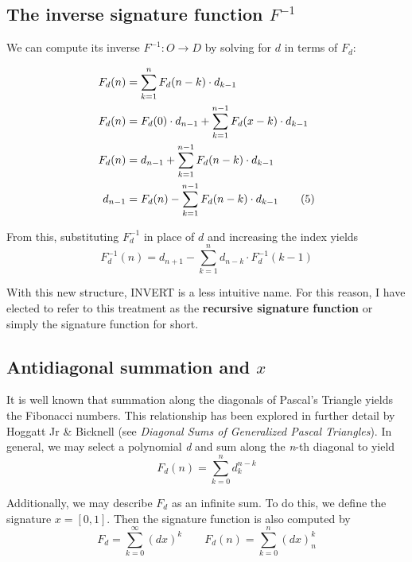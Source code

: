 \documentclass{article}
\begin{document}
\subsection{The inverse signature function $F^{-1}$}

\noindent We can compute its inverse $F^{-1} : O \rightarrow D$ by solving for $d$ in terms of $F_d$:

\begin{align*}
 F_{d}(n) &= \sum_{k=1}^{n} F_{d}(n-k) \cdot d_{k-1}\\
F_{d}(n) &= F_d(0) \cdot d_{n-1} + \sum_{k=1}^{n-1} F_{d}(x-k) \cdot d_{k-1}\\
F_{d}(n) &= d_{n-1} +  \sum_{k=1}^{n-1} F_{d}(n-k) \cdot d_{k-1}\\
d_{n-1} &= F_{d}(n) - \sum_{k=1}^{n-1} F_{d}(n-k) \cdot d_{k-1}\tag{5\refstepcounter{equation}} \end{align*}

\noindent From this, substituting $F_{d}^{-1}$ in place of $d$ and increasing the index yields \begin{equation}F_{d}^{-1}(n) = d_{n+1} - \sum_{k=1}^{n} d_{n-k} \cdot F_{d}^{-1}(k-1)\end{equation}

\noindent With this new structure, INVERT is a less intuitive name. For this reason, I have elected to refer to this treatment as the \textbf{recursive signature function} or simply the signature function for short.

\subsection{Antidiagonal summation and $x$ }

It is well known that summation along the diagonals of Pascal's Triangle yields the Fibonacci numbers. This relationship has been explored in further detail by Hoggatt Jr \& Bicknell (see \textit{Diagonal Sums of Generalized Pascal Triangles}). In general, we may select a polynomial \textit{d} and sum along the \textit{n}-th diagonal to yield \begin{equation} F_{d}(n) = \sum_{k=0}^n d_{k}^{n-k}\end{equation}

\noindent Additionally, we may describe $F_d$ as an infinite sum. To do this, we define the signature $x = [0, 1]$. Then the signature function is also computed by \begin{equation}F_d = \sum_{k=0}^{\infty} (d x )^k \qquad  F_d(n) = \sum_{k=0}^{n} (d x )_{n}^k\end{equation}
\end{document}
